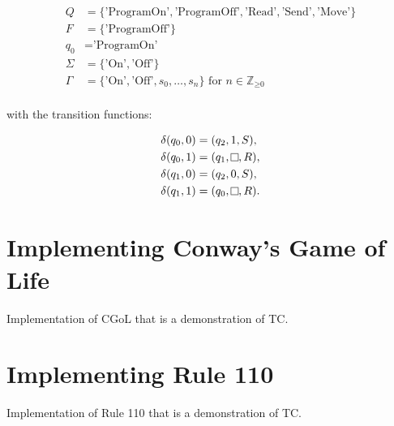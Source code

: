 \[
    \begin{aligned}
        Q &= \{\text{'ProgramOn'}, \text{'ProgramOff'}, \text{'Read'}, \text{'Send'}, \text{'Move'}\}\\
        F &= \{\text{'ProgramOff'}\}\\
        q_{0} &= \text{'ProgramOn'}\\
        \Sigma &= \{\text{'On'}, \text{'Off'}\}\\
        \Gamma &= \{\text{'On'}, \text{'Off'}, s_{0}, \dots, s_{n}\} \text{ for } n \in \mathbb{Z}_{\geq \text{0}}\\
    \end{aligned}
\]

with the transition functions: 

\[
    \begin{aligned}
        \delta (q_{0}, 0) &= (q_{2}, 1, S),\\
        \delta (q_{0}, 1) &= (q_{1}, \raisebox{0.1cm}{\fbox{}}, R),\\
        \delta (q_{1}, 0) &= (q_{2}, 0, S),\\
        \delta (q_{1}, 1) &= (q_{0}, \raisebox{0.1cm}{\fbox{}}, R).\\
    \end{aligned}
\]

\section{Implementing Conway's Game of Life}\label{sec:ImplementCGoL}

Implementation of CGoL that is a demonstration of TC.

\section{Implementing Rule 110}\label{sec:ImplementRule110}

Implementation of Rule 110 that is a demonstration of TC.
